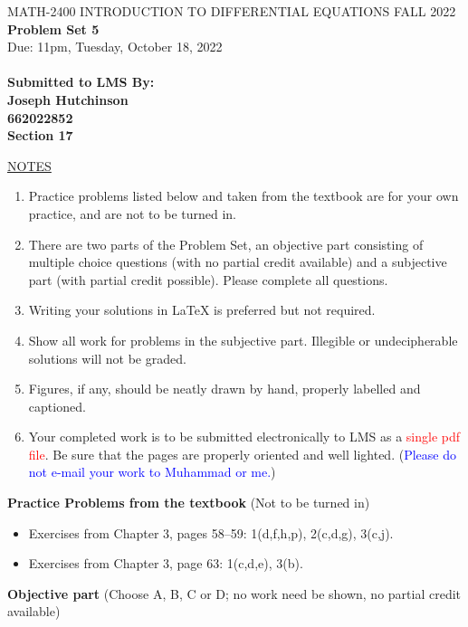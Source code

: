 \documentclass{article}
\begin{document}
\begin{center}
\large{ MATH-2400 \hspace{.27in}  INTRODUCTION TO DIFFERENTIAL EQUATIONS \hspace{.27in}FALL 2022\bigskip\\ {\bf Problem Set 5} \smallskip\\ Due: 11pm, Tuesday, October 18, 2022}\\
\textbf{\\Submitted to LMS By:\\ Joseph Hutchinson\\ 662022852 \\ Section 17 }
\end{center}

\bigskip\noindent
\underline{NOTES}
\begin{enumerate}
\item Practice problems listed below and taken from the textbook are for your own practice, and are not to be turned in.
\item There are two parts of the Problem Set, an objective part consisting of multiple choice questions (with no partial credit available) and a subjective part (with partial credit possible).  Please complete all questions.
\item Writing your solutions in {\LaTeX} is preferred but not required.
\item Show all work for problems in the subjective part.  Illegible or undecipherable solutions will not be graded. 
\item Figures, if any, should be neatly drawn by hand, properly labelled and captioned.  
\item Your completed work is to be submitted electronically to LMS  as a \textcolor{red}{single pdf file}. Be sure that the pages are properly oriented and well lighted.  (\textcolor{blue}{Please do not e-mail your work to Muhammad or me.})
\end{enumerate}

\bigskip\noindent
{\bf Practice Problems from the textbook} (Not to be turned in)
\begin{itemize}
\item
Exercises from Chapter 3, pages 58--59: 1(d,f,h,p), 2(c,d,g), 3(c,j).
\item
Exercises from Chapter 3, page 63: 1(c,d,e), 3(b).
\end{itemize}

\newpage\noindent
{\bf Objective part} (Choose A, B, C or D; no work need be shown, no partial credit available)
\end{document}
